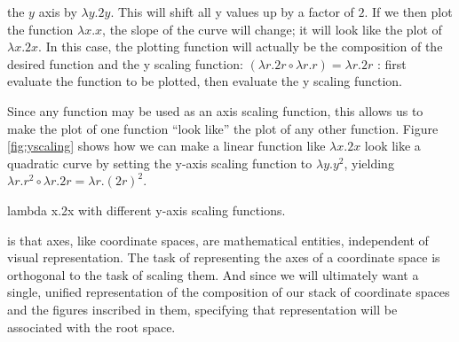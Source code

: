 \documentclass[12pt]{tufte-handout}
\numberwithin{equation}{subsection}
\numberwithin{equation}{subsection}
\begin{document}
{   the \(y\) axis by \(\lambda y.2y\).
  This will shift all y values up by a factor of \(2\).  If we then plot
  the function \(\lambda x.x\), the slope of the curve will change; it
  will look like the plot of \(\lambda x.2x\).  In this case, the
  plotting function will actually be the composition of the desired
  function and the y scaling function: \((\lambda r.2r\circ\lambda r.r)
  = \lambda r.2r\)%
  : first evaluate the function to be plotted, then
  evaluate the y scaling function.

  Since any function may be used as an axis scaling function, this
  allows us to make the plot of one function ``look like'' the plot of
  any other function.  Figure \ref{fig:yscaling} shows how we can make a
  linear function like \(\lambda x.2x\) look like a quadratic curve by setting the y-axis
  scaling function to \(\lambda y.y^2\), yielding \(\lambda
  r.r^2\circ\lambda r.2r = \lambda r.(2r)^2\).

  \begin{marginfigure}[12pt]%
    \hspace{8pt}
    \vspace{12pt}
    \caption{lambda x.2x with different y-axis scaling functions.}
    \label{fig:yscaling}
  \end{marginfigure}%

   is that axes, like coordinate
  spaces, are mathematical entities, independent of visual
  representation.  The task of representing the axes of a coordinate
  space is orthogonal to the task of scaling them.  And since we will
  ultimately want a single, unified representation of the composition of
  our stack of coordinate spaces and the figures inscribed in them,
  specifying that representation will be associated with the root
  space.

}
\end{document}
